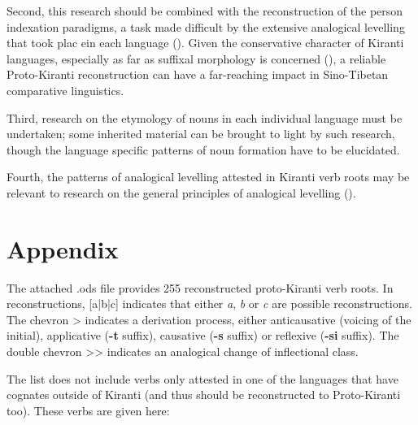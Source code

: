 \documentclass[oldfontcommands,oneside,a4paper,11pt]{article}
\newcommand{\ipa}[1]{\textbf{{\phon\mbox{#1}}}} %
\begin{document}
Second, this research should be combined with the reconstruction of the person indexation paradigms, a task made difficult by the extensive analogical levelling that took plac ein each language (\citealt{jacques16tonogenesis}). Given the conservative character of Kiranti languages, especially as far as suffixal morphology is concerned (\citealt{driem93agreement, delancey10agreement, jacques12agreement}), a reliable Proto-Kiranti reconstruction can  have a far-reaching impact in Sino-Tibetan comparative linguistics.

Third, research on the etymology of nouns in each individual language must be undertaken; some inherited material can be brought to light by such research, though the  language specific patterns of noun formation have to be elucidated.


Fourth, the patterns of analogical levelling attested in Kiranti verb roots may be relevant to research on the general principles of analogical levelling (\citealt{hill07ausgleich, hill14conditioned,jacques16ebde}).


\section{Appendix} \label{sec:appendix}
The attached .ods file provides 255 reconstructed proto-Kiranti verb roots. In reconstructions, [a|b|c] indicates that either \textit{a}, \textit{b} or \textit{c} are possible reconstructions. The chevron > indicates a derivation process, either anticausative (voicing of the initial), applicative (\ipa{-t} suffix), causative (\ipa{-s} suffix) or reflexive (\ipa{-si} suffix). The double chevron {>}{>} indicates an analogical change of inflectional class.

The list does not include verbs only attested in one of the languages that have cognates outside of Kiranti (and thus should be reconstructed to Proto-Kiranti too). These verbs are given here:
\end{document}

